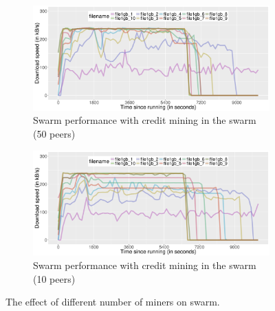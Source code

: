 \begin{figure}[h]
	\begin{subfigure}[h]{\textwidth}
		\centering
		\includegraphics[width=\textwidth]{pics/results/swperf_sc2.png}
		\caption{Swarm performance with credit mining in the swarm (50 peers)}
		\label{fig:swarmcmperf}
		
	\end{subfigure}
	\begin{subfigure}[h]{\textwidth}
		\centering
		\includegraphics[width=\textwidth]{pics/results/swperf_sc1_10.png}
		\caption{Swarm performance with credit mining in the swarm (10 peers)}
		\label{fig:swarmcm10perf}
	\end{subfigure}
	\caption{The effect of different number of miners on swarm.}
\end{figure}

